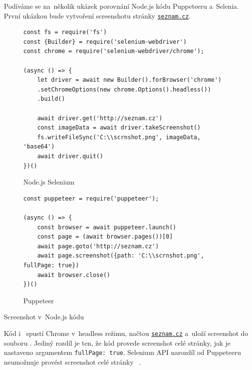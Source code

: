 \documentclass[12pt, a4paper, twoside]{article}
\begin{document}
	Podíváme se na~několik ukázek porovnání Node.js kódu Puppeteeru a~Selenia. První ukázkou bude vytvoření screenshotu stránky \href{https://seznam.cz}{\nolinkurl{seznam.cz}}.
	 \begin{codefigure}[H]
		\begin{subfigure}[t]{\textwidth}
			\begin{lstlisting}[style=MyJavaScript]
const fs = require('fs')
const {Builder} = require('selenium-webdriver')
const chrome = require('selenium-webdriver/chrome');
	
(async () => {
	let driver = await new Builder().forBrowser('chrome')
	.setChromeOptions(new chrome.Options().headless())
	.build()

	await driver.get('http://seznam.cz')
	const imageData = await driver.takeScreenshot()
	fs.writeFileSync('C:\\scrnshot.png', imageData, 'base64')
	await driver.quit()
})() 
			\end{lstlisting}
			\caption{Node.js Selenium}
			\label{subfig:seleniumScreenshot}
		\end{subfigure}   
	\end{codefigure}
	\begin{codefigure}[H]\ContinuedFloat
		\begin{subfigure}[t]{\textwidth}
			\begin{lstlisting}[style=MyJavaScript]
const puppeteer = require('puppeteer');

(async () => {
	const browser = await puppeteer.launch()
	const page = (await browser.pages())[0]
	await page.goto('http://seznam.cz')
	await page.screenshot({path: 'C:\\scrnshot.png', fullPage: true})
	await browser.close()
})()
			\end{lstlisting}
			\caption{Puppeteer}
			\label{subfig:puppeteerScreenshot}
		\end{subfigure}
		\caption{Screenshot v~Node.js kódu}
	\end{codefigure}

	Kód  i~ spustí Chrome v~headless režimu, načtou \href{https://seznam.cz}{\nolinkurl{seznam.cz}} a~uloží screenshot do souboru . Jediný rozdíl je ten, že kód  provede screenshot celé stránky, jak je nastaveno argumentem \texttt{fullPage: true}. Selenium API narozdíl od Puppeteeru neumožnuje provést screenshot celé stránky~\cite{seleniumNodeJsDocs} \label{text:seleniumFullPageScreenshot}.
	
\end{document}
